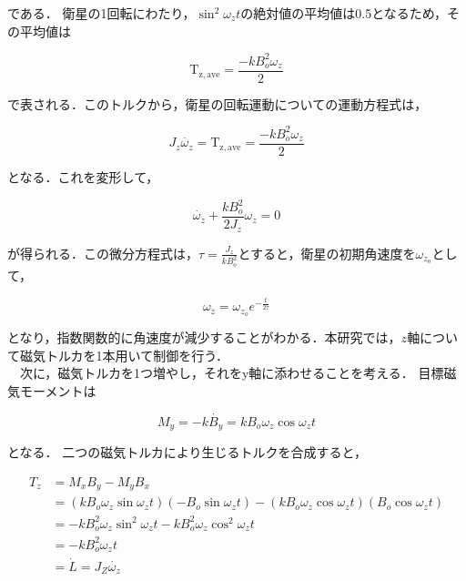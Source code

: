 である．
衛星の1回転にわたり，$\sin^2 \omega_zt$の絶対値の平均値は0.5となるため，その平均値は

\begin{equation}
    \mathrm{T_\mathrm{z,ave}} = \frac{-kB_o^2\omega_z}{2}
\end{equation}

で表される．このトルクから，衛星の回転運動についての運動方程式は，

\begin{equation}
    J_z\dot{\omega_z} = \mathrm{T_\mathrm{z,ave}} = \frac{-kB_o^2\omega_z}{2}
\end{equation}

となる．これを変形して，

\begin{equation}
    \dot{\omega_z}+\frac{kB_o^2}{2J_z}\omega_z = 0
\end{equation}

が得られる．この微分方程式は，$\tau=\frac{J_z}{kB_o^2}$とすると，衛星の初期角速度を$\omega_{z_o}$として，

\begin{equation}
    \omega_z = \omega_{z_o}e^{-\frac{t}{2\tau}} 
\end{equation}

となり，指数関数的に角速度が減少することがわかる．本研究では，$z$軸について磁気トルカを1本用いて制御を行う．\\
　次に，磁気トルカを1つ増やし，それをy軸に添わせることを考える．
目標磁気モーメントは

\begin{equation}
    M_y = -k\dot{B_y} = kB_o\omega_z\cos\omega_zt
\end{equation}

となる．
二つの磁気トルカにより生じるトルクを合成すると，

\begin{equation}
    \begin{aligned}
        T_z &= M_xB_y - M_yB_x\\
            &= (kB_o\omega_z\sin\omega_zt)(-B_o\sin\omega_zt)-(kB_o\omega_z\cos\omega_zt)(B_o\cos\omega_zt)\\
            &= -kB_o^2\omega_z\sin^2\omega_zt - kB_o^2\omega_z\cos^2\omega_zt\\
            &= -kB_o^2\omega_zt\\
            &= \dot{L} = J_Z\dot{\omega_z}
    \end{aligned}
\end{equation}


